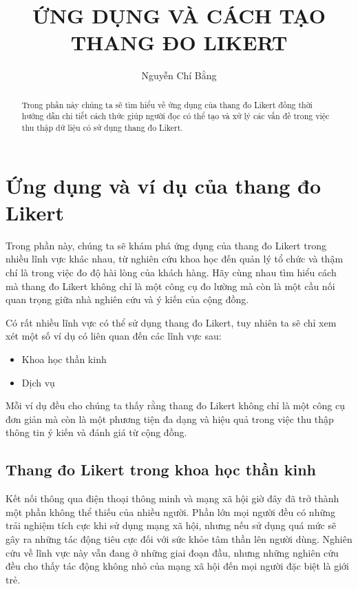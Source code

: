 \documentclass[12pt]{article}
\begin{document}
\title{ỨNG DỤNG VÀ CÁCH TẠO \\ THANG ĐO LIKERT}
\author{Nguyễn Chí Bằng}
\maketitle
\begin{abstract}
Trong phần này chúng ta sẽ tìm hiểu về ứng dụng của thang đo Likert đồng thời hướng dẫn chi tiết cách thức giúp người đọc có thể tạo và xử lý các vấn đề trong việc thu thập dữ liệu có sử dụng thang đo Likert. 
\end{abstract}

\tableofcontents

\section{Ứng dụng và ví dụ của thang đo Likert}
\phantom{}

Trong phần này, chúng ta sẽ khám phá ứng dụng của thang đo Likert trong nhiều lĩnh vực khác nhau, từ nghiên cứu khoa học đến quản lý tổ chức và thậm chí là trong việc đo độ hài lòng của khách hàng. Hãy cùng nhau tìm hiểu cách mà thang đo Likert không chỉ là một công cụ đo lường mà còn là một cầu nối quan trọng giữa nhà nghiên cứu và ý kiến của cộng đồng.

Có rất nhiều lĩnh vực có thể sử dụng thang đo Likert, tuy nhiên ta sẽ chỉ xem xét một số ví dụ có liên quan đến các lĩnh vực sau:
\begin{itemize}
    \item Khoa học thần kinh
    \item Dịch vụ
\end{itemize}

Mỗi ví dụ đều cho chúng ta thấy rằng thang đo Likert không chỉ là một công cụ đơn giản mà còn là một phương tiện đa dạng và hiệu quả trong việc thu thập thông tin ý kiến và đánh giá từ cộng đồng.

\subsection{Thang đo Likert trong khoa học thần kinh}
\phantom{}

Kết nối thông qua điện thoại thông minh và mạng xã hội giờ đây đã trở thành một phần không thể thiếu của nhiều người. Phần lớn mọi người đều có những trải nghiệm tích cực khi sử dụng mạng xã hội, nhưng nếu sử dụng quá mức sẽ gây ra những tác động tiêu cực đối với sức khỏe tâm thần lên người dùng. Nghiên cứu về lĩnh vực này vẫn đang ở những giai đoạn đầu, nhưng những nghiên cứu đều cho thấy tác động không nhỏ của mạng xã hội đến mọi người đặc biệt là giới trẻ.
\end{document}
